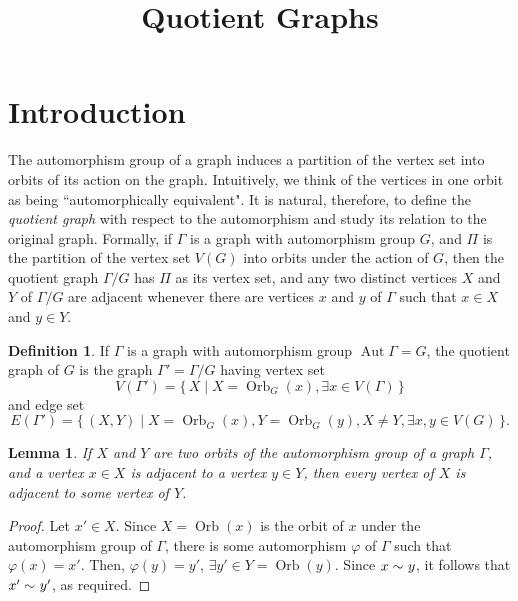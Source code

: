 \documentclass[12pt,a4paper]{amsart}
\title{Quotient Graphs}
\date{}
\newtheorem{Lemma}[Theorem]{Lemma}
\theoremstyle{remark}
\theoremstyle{definition}
\newtheorem{Definition}[Theorem]{Definition}
\newcommand{\adj}[1]{\sim_{\scriptscriptstyle #1}}
\DeclareMathOperator{\aut}{Aut}
\DeclareMathOperator{\orb}{Orb}
\begin{document}
\maketitle

\section{Introduction}
\label{sec:Intro}

The automorphism group of a graph induces a partition of the vertex set into orbits of its action on the graph. Intuitively, we think of the vertices in one orbit as being ``automorphically equivalent". It is natural, therefore, to define the \emph{quotient graph} with respect to the automorphism and study its relation to the original graph. Formally, if $\Gamma$ is a graph with automorphism group $G$, and $\mathcal \Pi$ is the partition of the vertex set $V(G)$ into orbits under the action of $G$, then the quotient graph $\Gamma/G$ has $\Pi$ as its vertex set, and any two distinct vertices $X$ and $Y$ of $\Gamma/G$ are adjacent whenever there are vertices $x$ and $y$ of $\Gamma$ such that $x \in X$ and $y \in Y$.

\begin{Definition}
If $\Gamma$ is a graph with automorphism group $\aut \Gamma = G$, the quotient graph of $G$ is the graph $\Gamma' = \Gamma/G$ having vertex set
\begin{equation*}
V(\Gamma') = \{\, X \mid X = \orb_G(x), \exists x \in V(\Gamma) \,\}
\end{equation*}
and edge set 
\begin{equation*}
E(\Gamma') = \{\, (X,Y) \mid X = \orb_G(x), Y = \orb_G(y), X \ne Y, \exists x, y \in V(G) \,\}.
\end{equation*}
\end{Definition}

\begin{Lemma}
\label{lem:xy=>x'y'}
If $X$ and $Y$ are two orbits of the automorphism group of a graph $\Gamma$, and a vertex $x \in X$ is adjacent to a vertex $y \in Y$, then every vertex of $X$ is adjacent to some vertex of $Y$.
\end{Lemma}
\begin{proof}
Let $x' \in X$. Since $X = \orb(x)$ is the orbit of $x$ under the automorphism group of $\Gamma$, there is some automorphism $\varphi$ of $\Gamma$ such that $\varphi(x) = x'$. Then, $\varphi(y) = y'$, $\exists y' \in Y = \orb(y)$. Since $x \adj{} y$, it follows that $x' \adj{} y'$, as required.
\end{proof}
\end{document}
